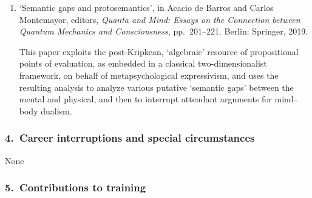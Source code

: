 \documentclass[12pt]{article}
\begin{document}
\begin{enumerate}
	\item `Semantic gaps and protosemantics', in Acacio de Barros and Carlos Montemayor, editors, \emph{Quanta and Mind: Essays on the Connection between Quantum Mechanics and Consciousness}, pp.~201--221. Berlin: Springer, 2019.
	
	This paper exploits the post-Kripkean, `algebraic' resource of propositional points of evaluation, as embedded in a classical two-dimensionalist framework, on behalf of metapsychological expressivism, and uses the resulting analysis to analyze various putative `semantic gaps' between the mental and physical, and then to interrupt attendant arguments for mind--body dualism.
	
	
	
	
	
\end{enumerate}

\subsubsection*{4.\ \quad Career interruptions and special circumstances}

None

\subsubsection*{5.\ \quad Contributions to training}
\end{document}
